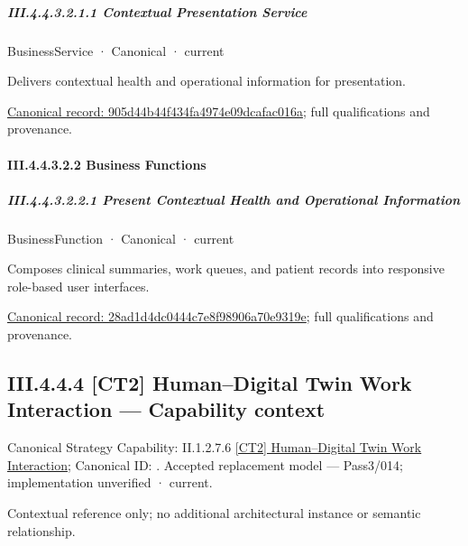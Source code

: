 \subparagraph*{III.4.4.3.2.1.1 Contextual Presentation Service}
\label{navigation:III.4.4.3.2.1.1}

\label{element:905d44b44f434fa4974e09dcafac016a}
{\small BusinessService · Canonical · current}\par

Delivers contextual health and operational information for presentation.


{\footnotesize \href{../../../../continuum/business/business-service/905d44b44f434fa4974e09dcafac016a.md}{Canonical record: 905d44b44f434fa4974e09dcafac016a}; full qualifications and provenance.}\par
\paragraph*{III.4.4.3.2.2 Business Functions}
\label{navigation:III.4.4.3.2.2}

\subparagraph*{III.4.4.3.2.2.1 Present Contextual Health and Operational Information}
\label{navigation:III.4.4.3.2.2.1}

\label{element:28ad1d4dc0444c7e8f98906a70e9319e}
{\small BusinessFunction · Canonical · current}\par

Composes clinical summaries, work queues, and patient records into responsive role-based user interfaces.


{\footnotesize \href{../../../../continuum/business/business-function/28ad1d4dc0444c7e8f98906a70e9319e.md}{Canonical record: 28ad1d4dc0444c7e8f98906a70e9319e}; full qualifications and provenance.}\par
\subsection*{III.4.4.4 [CT2] Human–Digital Twin Work Interaction — Capability context}
\label{navigation:III.4.4.4}

{\small Canonical Strategy Capability: II.1.2.7.6 \hyperref[element:8bcaa906b67443019e75ffd13af64c9c]{[CT2] Human–Digital Twin Work Interaction}; Canonical ID: \texttt{}. Accepted replacement model — Pass3/014; implementation unverified · current.}\par
Contextual reference only; no additional architectural instance or semantic relationship.\par
